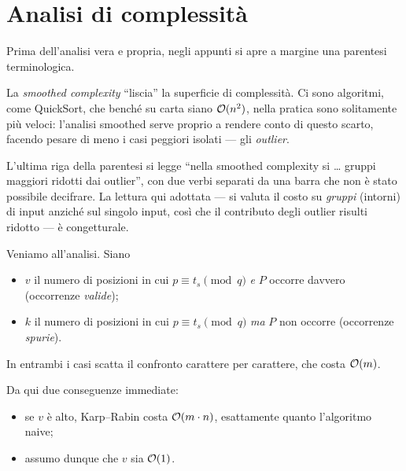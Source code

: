 \section{Analisi di complessità}

Prima dell'analisi vera e propria, negli appunti si apre a margine una parentesi
terminologica.

\begin{osservazione}
La \emph{smoothed complexity} ``liscia'' la superficie di complessità. Ci sono algoritmi, come
QuickSort, che benché su carta siano $\mathcal{O}(n^{2})$, nella pratica sono solitamente più veloci:
l'analisi smoothed serve proprio a rendere conto di questo scarto, facendo pesare di meno i
casi peggiori isolati --- gli \emph{outlier}.
\end{osservazione}

\begin{dubbio}
L'ultima riga della parentesi si legge ``nella smoothed complexity si \dots{} gruppi maggiori
ridotti dai outlier'', con due verbi separati da una barra che non è stato possibile
decifrare. La lettura qui adottata --- si valuta il costo su \emph{gruppi} (intorni) di input
anziché sul singolo input, così che il contributo degli outlier risulti ridotto --- è
congetturale.
\end{dubbio}

Veniamo all'analisi. Siano
\begin{itemize}
  \item $v$ il numero di posizioni in cui $p \equiv t_s \pmod{q}$ \emph{e} $P$ occorre
        davvero (occorrenze \emph{valide});
  \item $k$ il numero di posizioni in cui $p \equiv t_s \pmod{q}$ \emph{ma} $P$ non occorre
        (occorrenze \emph{spurie}).
\end{itemize}
In entrambi i casi scatta il confronto carattere per carattere, che costa $\mathcal{O}(m)$.

Da qui due conseguenze immediate:
\begin{itemize}
  \item se $v$ è alto, Karp--Rabin costa $\mathcal{O}(m\cdot n)$, esattamente quanto l'algoritmo
        naive;
  \item assumo dunque che $v$ sia $\mathcal{O}(1)$.
\end{itemize}

